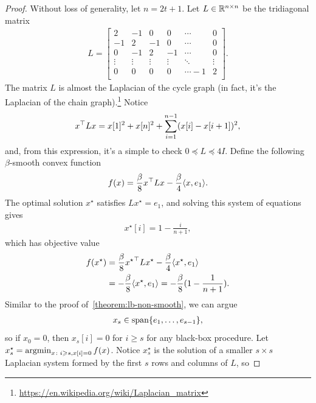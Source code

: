 \begin{proof}
Without loss of generality, let $n = 2t+1$.
Let $L \in \mathbb{R}^{n \times n}$ be the tridiagonal matrix
\begin{align*}
    L =
    \begin{bmatrix}
        2 & -1 & 0 & 0 & \cdots & 0 \\
        -1 & 2 & -1 & 0 & \cdots & 0 \\
        0 & -1 & 2 & -1  & \cdots & 0 \\
        \vdots & \vdots & \vdots & \vdots & \ddots & \vdots \\
        0 & 0 & 0 & 0 & \cdots -1 & 2  \\
    \end{bmatrix}.
\end{align*}
The matrix $L$ is almost the Laplacian of the cycle
graph (in fact, it's the Laplacian of the chain graph).\footnote{\url{https://en.wikipedia.org/wiki/Laplacian_matrix}}
Notice
\begin{align*}
    x^\top L x = x[1]^2 + x[n]^2 + \sum_{i=1}^{n-1} (x[i] - x[i+1])^2,
\end{align*}
and, from this expression, it's a simple to check
$0 \preceq L \preceq 4I$.
Define the following $\beta$-smooth convex function
\begin{align*}
    f(x) = \frac{\beta}{8} x^\top L x - \frac{\beta}{4}\langle x, e_1 \rangle.
\end{align*}
The optimal solution $x^\star$ satisfies $Lx^\star = e_1$, and solving this 
system of equations gives
\begin{align*}
    x^\star[i] = 1 - \frac{i}{n+1},
\end{align*}
which has objective value
\begin{align*}
    f(x^\star)
    &=  \frac{\beta}{8} {x^\star}^\top L x^\star - \frac{\beta}{4}\langle
    x^\star, e_1 \rangle \\
    &= -\frac{\beta}{8} \langle x^\star, e_1 \rangle
    = -\frac{\beta}{8} (1 - \frac{1}{n+1} ).
\end{align*}
Similar to the proof of~\eqref{theorem:lb-non-smooth}, we can argue
\begin{align*}
    x_s \in \mathop{\rm span}\{e_1, \dots, e_{s-1}\},
\end{align*}
so if $x_0 = 0$, then $x_s[i] = 0$ for $i \geq s$ for any black-box procedure.
Let $x_s^\star = \mathop{\rm argmin}_{x \colon i\geqslant s, x[i] = 0} f(x)$. Notice $x_s^\star$
is the solution of a smaller $s \times s$ Laplacian system formed by the
first $s$ rows and columns of $L$, so

\end{proof}
